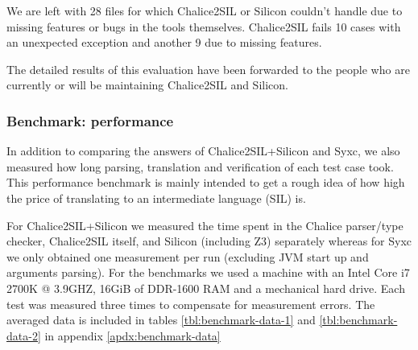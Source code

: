 We are left with 28 files for which Chalice2SIL or Silicon couldn't handle due to missing features or bugs in the tools themselves.
Chalice2SIL fails 10 cases with an unexpected exception and another 9 due to missing features.

The detailed results of this evaluation have been forwarded to the people who are currently or will be maintaining Chalice2SIL and Silicon.

\subsubsection{Benchmark: performance}
In addition to comparing the answers of Chalice2SIL+Silicon and Syxc, we also measured how long parsing, translation and verification of each test case took.
This performance benchmark is mainly intended to get a rough idea of how high the price of translating to an intermediate language (SIL) is.

For Chalice2SIL+Silicon we measured the time spent in the Chalice parser/type checker, Chalice2SIL itself, and Silicon (including Z3) separately whereas for Syxc we only obtained one measurement per run (excluding JVM start up and arguments parsing).
For the benchmarks we used a machine with an Intel Core i7 2700K @ 3.9GHZ, 16GiB of DDR-1600 RAM and a mechanical hard drive.
Each test was measured three times to compensate for measurement errors.
The averaged data is included in tables \ref{tbl:benchmark-data-1} and \ref{tbl:benchmark-data-2} in appendix \ref{apdx:benchmark-data}

